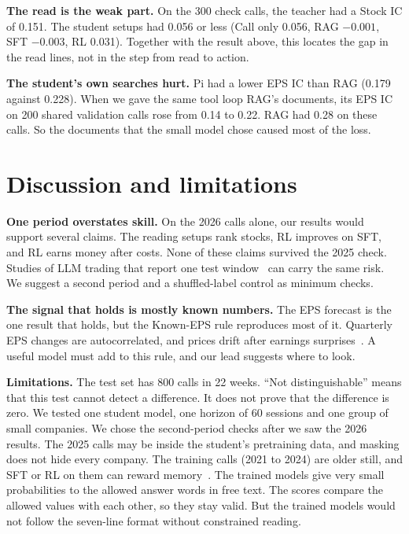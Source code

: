 \documentclass[sigconf,nonacm]{acmart}
\begin{document}
\textbf{The read is the weak part.}
On the 300 check calls, the teacher had a Stock IC of 0.151.
The student setups had 0.056 or less (Call only 0.056, RAG $-0.001$, SFT $-0.003$, RL 0.031).
Together with the result above, this locates the gap in the read lines, not in the step from read to action.

\textbf{The student's own searches hurt.}
Pi had a lower EPS IC than RAG (0.179 against 0.228).
When we gave the same tool loop RAG's documents, its EPS IC on 200 shared validation calls rose from 0.14 to 0.22.
RAG had 0.28 on these calls.
So the documents that the small model chose caused most of the loss.

\section{Discussion and limitations}

\textbf{One period overstates skill.}
On the 2026 calls alone, our results would support several claims.
The reading setups rank stocks, RL improves on SFT, and RL earns money after costs.
None of these claims survived the 2025 check.
Studies of LLM trading that report one test window~\cite{xiao2024tradingagents,chen2025stockbench} can carry the same risk.
We suggest a second period and a shuffled-label control as minimum checks.

\textbf{The signal that holds is mostly known numbers.}
The EPS forecast is the one result that holds, but the Known-EPS rule reproduces most of it.
Quarterly EPS changes are autocorrelated, and prices drift after earnings surprises~\cite{bernardthomas1990}.
A useful model must add to this rule, and our lead suggests where to look.

\textbf{Limitations.}
The test set has 800 calls in 22 weeks.
``Not distinguishable'' means that this test cannot detect a difference.
It does not prove that the difference is zero.
We tested one student model, one horizon of 60 sessions and one group of small companies.
We chose the second-period checks after we saw the 2026 results.
The 2025 calls may be inside the student's pretraining data, and masking does not hide every company.
The training calls (2021 to 2024) are older still, and SFT or RL on them can reward memory~\cite{koijenlevy2026}.
The trained models give very small probabilities to the allowed answer words in free text.
The scores compare the allowed values with each other, so they stay valid.
But the trained models would not follow the seven-line format without constrained reading.
\end{document}
